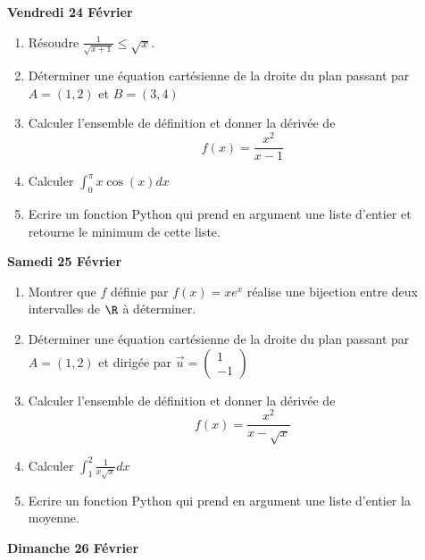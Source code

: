 \documentclass[a4paper, 11pt,reqno]{article}
\newcommand\vv[1]{\overrightarrow{#1}}
\begin{document}
\begin{center}
\textbf{Vendredi 24 Février }
\end{center}

\begin{enumerate}
\item Résoudre $\frac{1}{\sqrt{x+1}}\leq \sqrt{x}$.
\item Déterminer une équation cartésienne de la droite du plan passant par $A=(1,2)$ et $B=(3,4)$
\item Calculer l'ensemble de définition et donner la dérivée de $$f(x) =\frac{x^2}{x-1}$$
\item Calculer $\int_0^\pi x\cos(x)dx$
\item Ecrire un fonction Python qui prend en argument une liste d'entier et retourne le minimum de cette liste. 
\end{enumerate}

\begin{center}
\textbf{Samedi 25 Février }
\end{center}
\begin{enumerate}
\item Montrer que $f $ définie par $f(x) = xe^x$ réalise une bijection entre deux intervalles de $\R$ à déterminer. 
\item Déterminer une équation cartésienne de la droite du plan passant par $A=(1,2)$ et dirigée par $\vv{u}=\begin{pmatrix}
1\\-1
\end{pmatrix}$
\item Calculer l'ensemble de définition et donner la dérivée de $$f(x) =\frac{x^2}{x-\sqrt{x}}$$
\item Calculer $\int_1^2 \frac{1}{x\sqrt{x}} 
dx$
\item Ecrire un fonction Python qui prend en argument une liste d'entier la moyenne. 
\end{enumerate}



\begin{center}
\textbf{Dimanche 26 Février }
\end{center}
\end{document}
